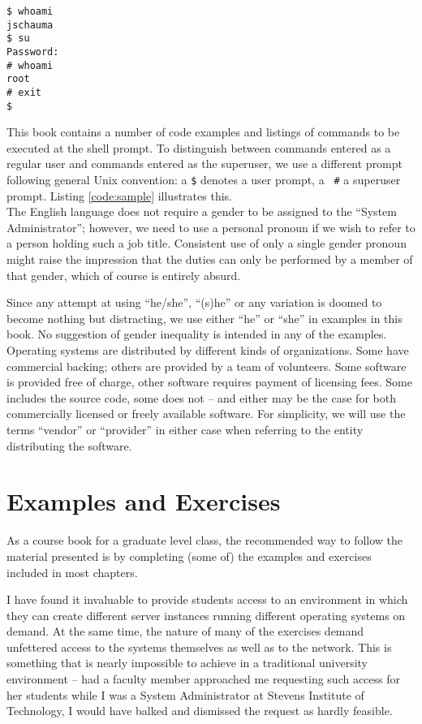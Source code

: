 \begin{lstlisting}[float,label=code:sample,caption=Sample command-line invocations]
$ whoami
jschauma
$ su
Password:
# whoami
root
# exit
$
\end{lstlisting}

This book contains a number of code examples and
listings of commands to be executed at the shell
prompt.  To distinguish between commands entered as a
regular user and commands entered as the superuser, we
use a different prompt following general Unix
convention: a {\tt \$} denotes a user prompt, a {\tt
\#} a superuser prompt.  Listing \ref{code:sample}
illustrates this. \\

The English language does not require a gender to be
assigned to the ``System Administrator''; however, we
need to use a personal pronoun if we wish to refer to
a person holding such a job title.  Consistent use of
only a single gender pronoun might raise the
impression that the duties can only be performed by a
member of that gender, which of course is entirely
absurd.

Since any attempt at using ``he/she'', ``(s)he'' or
any variation is doomed to become nothing but
distracting, we use either ``he'' or ``she'' in
examples in this book.  No suggestion of gender
inequality is intended in any of the examples. \\

Operating systems are distributed by different kinds
of organizations.  Some have commercial backing;
others are provided by a team of volunteers.  Some
software is provided free of charge, other software
requires payment of licensing fees.  Some includes the
source code, some does not -- and either may be the
case for both commercially licensed or freely
available software.  For simplicity, we will use the
terms ``vendor'' or ``provider'' in either case when
referring to the entity distributing the software.

\section*{Examples and Exercises}

As a course book for a graduate level class, the
recommended way to follow the material presented is by
completing (some of) the examples and exercises
included in most chapters.

I have found it invaluable to provide students access
to an environment in which they can create different
server instances running different operating systems
on demand.  At the same time, the nature of many of
the exercises demand unfettered access to the systems
themselves as well as to the network.  This is
something that is nearly impossible to achieve in a
traditional university environment -- had a faculty
member approached me requesting such access for her
students while I was a System Administrator at Stevens
Institute of Technology, I would have balked and
dismissed the request as hardly feasible.

